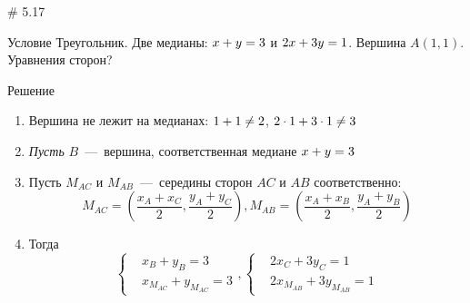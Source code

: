 \documentclass[russian]{beamer}
\begin{document}
  \begin{frame}{\# 5.17}
    \begin{block}{Условие}
      Треугольник.
      Две медианы: $x \hm+ y \hm= 3$ и $2x \hm+ 3y \hm= 1$.
      Вершина $A(1, 1)$.
      Уравнения сторон?
    \end{block}
    
    \pause
    
    \begin{block}{Решение}
      \begin{enumerate}
        \item Вершина не лежит на медианах: $1 \hm+ 1 \hm{\not=} 2$, $2 \hm\cdot 1 \hm+ 3 \hm\cdot 1 \hm{\not=} 3$
        
        \pause
        
        \item \emph{Пусть} $B$~---~вершина, соответственная медиане $x \hm+ y \hm= 3$
        
        \pause
        
        \item
        Пусть $M_{AC}$ и $M_{AB}$~---~середины сторон $AC$ и $AB$ соответственно:
        \[
            M_{AC} = \left(\frac{x_A + x_C}{2}, \frac{y_A + y_C}{2}\right),
            M_{AB} = \left(\frac{x_A + x_B}{2}, \frac{y_A + y_B}{2}\right)
        \]
        
        \pause
        
        \item Тогда
        \[
          \left\{
          \begin{aligned}
            &x_B + y_B = 3\\
            &x_{M_{AC}} + y_{M_{AC}} = 3
          \end{aligned}
          \right.,
          \left\{
          \begin{aligned}
            &2x_C + 3y_C = 1\\
            &2x_{M_{AB}} + 3y_{M_{AB}} = 1
          \end{aligned}
          \right.
        \]
      \end{enumerate}
    \end{block}
  \end{frame}
    
\end{document}
